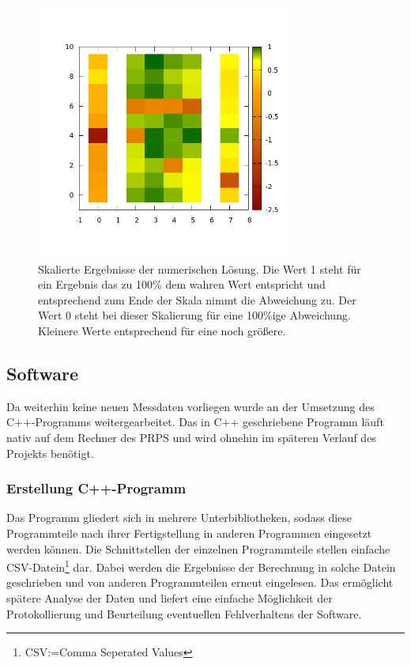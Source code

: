 \documentclass[a4paper,12pt,fleqn]{article}
\begin{document}
\begin{figure}[h]
         \centering 
         \includegraphics[width=0.75\textwidth]{common/img/matplot.png}
         \caption{Skalierte Ergebnisse der numerischen Lösung. Die Wert 1 steht für ein Ergebnis das zu 100\% dem wahren Wert entspricht und entsprechend zum Ende der Skala nimmt die Abweichung zu. Der Wert 0 steht bei dieser Skalierung für eine 100\%ige Abweichung. Kleinere Werte entsprechend für eine noch größere. }
         \label{fig:Matplot}
\end{figure}
%
\subsection{Software}
%
Da weiterhin keine neuen Messdaten vorliegen wurde an der Umsetzung des C++-Programms weitergearbeitet. Das in C++ geschriebene Programm läuft nativ auf dem Rechner des PRPS und wird ohnehin im späteren Verlauf des Projekts benötigt.
%
\subsubsection{Erstellung C++-Programm}
%
Das Programm gliedert sich in mehrere Unterbibliotheken, sodass diese Programmteile nach ihrer Fertigstellung in anderen Programmen eingesetzt werden können. Die Schnittstellen der einzelnen Programmteile stellen einfache CSV-Datein\footnote{CSV:=Comma Seperated Values} dar. Dabei werden die Ergebnisse der Berechnung in solche Datein geschrieben und von anderen Programmteilen erneut eingelesen. Das ermöglicht spätere Analyse der Daten und liefert eine einfache Möglichkeit der Protokollierung und Beurteilung eventuellen Fehlverhaltens der Software.
%
\end{document}

